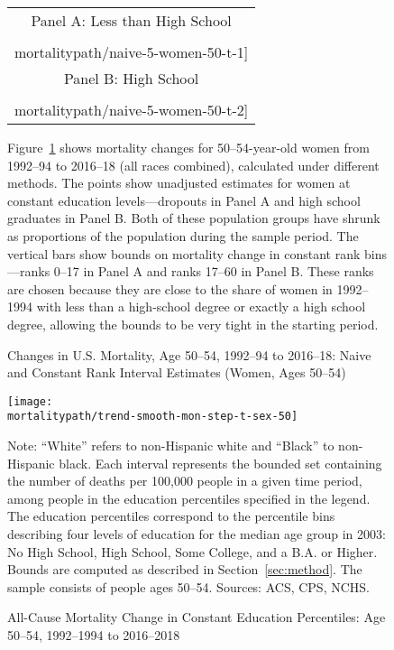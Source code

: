 \begin{figure}[htbp]
\caption{Changes in U.S. Mortality, Age 50--54, 1992--94 to 2016--18:
  \cnewline Naive and Constant Rank Interval Estimates (Women, Ages 50--54)}
\label{fig:mort_bias}
\begin{center}

  \begin{tabular}{c}
    Panel A: Less than High School \\
    \texttt{[image: \\mortalitypath/naive-5-women-50-t-1]}
    \\
 Panel B: High School \\
    \texttt{[image: \\mortalitypath/naive-5-women-50-t-2]} \\
    \hline
  \end{tabular}
\end{center}
\noindent
Figure~\ref{fig:mort_bias} shows mortality changes for 50--54-year-old women from 1992--94 to 2016--18 (all races combined), calculated under different methods. The points show unadjusted estimates for women at constant education levels---dropouts in Panel A and high school graduates in Panel B. Both of these population groups have shrunk as proportions of the population during the sample period. The vertical bars show bounds on mortality change in constant rank bins---ranks 0--17 in Panel A and ranks 17--60 in Panel B. These ranks are chosen because they are close to the share of women in 1992--1994 with less than a high-school degree or exactly a high school degree, allowing the bounds to be very tight in the starting period.
\end{figure}

\begin{figure}[H]
    \caption{All-Cause Mortality Change in Constant Education
      Percentiles: \cnewline Age 50--54, 1992--1994 to 2016--2018}
    \label{fig:trend}
    \begin{center}
      \texttt{[image: \\mortalitypath/trend-smooth-mon-step-t-sex-50]}
    \end{center}
  \footnotesize{Note: ``White'' refers to non-Hispanic white and ``Black'' to non-Hispanic black.  Each interval represents the bounded set containing the number of deaths per 100,000 people in a given time period, among people in the education percentiles specified in the legend. The education percentiles correspond to the percentile bins describing four levels of education for the median age group in 2003: No High School, High School, Some College, and a B.A. or Higher. Bounds are computed as described in Section~\ref{sec:method}. The sample consists of people ages 50--54. Sources: ACS, CPS, NCHS.}
\end{figure}

